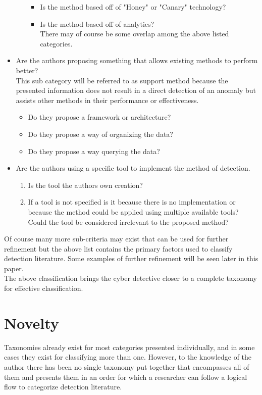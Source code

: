 \documentclass[10pt]{IEEEtran}
\begin{document}
\begin{itemize}
\begin{itemize}
\begin{itemize}
                \item Is the method based off of "Honey" or "Canary" technology?
                \item Is the method based off of analytics?\\
            There may of course be some overlap among the above listed categories.
            \end{itemize}
        \end{itemize}
    \item Are the authors proposing something that allows existing methods to perform better?\\
    This sub category will be referred to as support method because the presented information does not result in a direct detection of an anomaly but assists other methods in their performance or effectiveness.
    \begin{itemize}
        \item Do they propose a framework or architecture?
        \item Do they propose a way of organizing the data?
        \item Do they propose a way querying the data?
    \end{itemize}
    \item Are the authors using a specific tool to implement the method of detection.
    \begin{enumerate}
        \item Is the tool the authors own creation? 
        \item If a tool is not specified is it because there is no implementation or because the method could be applied using multiple available tools? Could the tool be considered irrelevant to the proposed method?
    \end{enumerate}
\end{itemize}
Of course many more sub-criteria may exist that can be used for further refinement but the above list contains the primary factors used to classify detection literature. Some examples of further refinement will be seen later in this paper.\\
The above classification brings the cyber detective closer to a complete taxonomy for effective classification.

\section{Novelty} Taxonomies already exist for most categories presented individually, and in some cases they exist for classifying more than one. However, to the knowledge of the author there has been no single taxonomy put together that encompasses all of them and presents them in an order for which a researcher can follow a logical flow to categorize detection literature.
\end{document}
